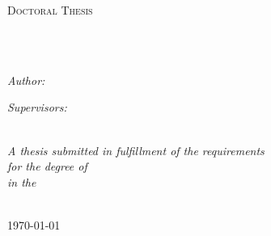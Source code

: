 \documentclass[
11pt, %
oneside, %
english, %
onehalfspacing, %
nolistspacing, %
liststotoc, %
headsepline, %
consistentlayout, %
]{name} %
\begin{document}
\begin{titlepage}
\begin{center}
\vspace*{.06\textheight}
{\scshape\LARGE \univname\par}\vspace{1.5cm} %
\textsc{\Large Doctoral Thesis}\\[0.5cm] %
\HRule \\[0.4cm] %
{\huge \bfseries \ttitle\par}\vspace{0.4cm} %
\HRule \\[1.5cm] %
 \begin{minipage}[t]{0.4\textwidth}
\begin{flushleft} \large
\emph{Author:}\\
\href{http://www.johnsmith.com}{\authorname} %
\end{flushleft}
\end{minipage}
\begin{minipage}[t]{0.4\textwidth}
\begin{flushright} \large
\emph{Supervisors:} \\
\href{http://www.jamessmith.com}{\supname}%
\end{flushright}
\end{minipage}\\[3cm]
 \vfill
\large \textit{A thesis submitted in fulfillment of the requirements\\ for the degree of \degreename}\\[0.3cm] %
\textit{in the}\\[0.4cm]
\deptname \\[2cm] %
 
\vfill

{\large \today}\\[4cm] %
 \vfill
\end{center}
\end{titlepage}
\end{document}
